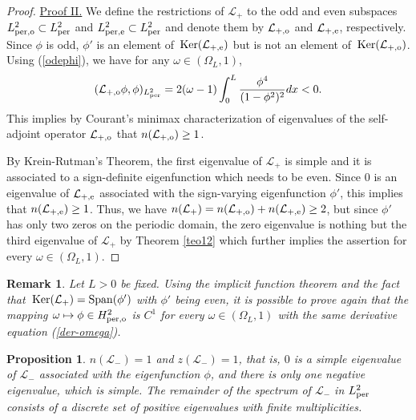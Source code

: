 \documentclass[12pt,reqno]{amsart}
\newcommand{\Ker}{{\rm \,Ker}}
\numberwithin{equation}{section}
\numberwithin{figure}{section}
\newtheorem{proposition}[theorem]{Proposition}
\newtheorem{remark}[theorem]{Remark}
\begin{document}
\begin{proof}
\underline{Proof II.} We define the restrictions of $\mathcal{L}_{+}$ to the odd and even subspaces $L_{\rm per,o}^2\subset L_{\rm per}^2$ and $L_{\rm per,e}^2\subset L_{\rm per}^2$ and denote them by  $\mathcal{L}_{+,\rm o}$ and $\mathcal{L}_{+,\rm e}$, respectively. Since $\phi$ is odd,  $\phi'$ is an element of $\Ker(\mathcal{L}_{+,\rm e})$ but is not an element of $\Ker(\mathcal{L}_{+,\rm o})$. Using (\ref{odephi}), we have for any $\omega \in (\Omega_L,1)$,
$$
		 	(\mathcal{L}_{+,\rm o}\phi,\phi)_{L_{\rm per}^2} = 2(\omega-1)\int_0^L\frac{\phi^4}{(1-\phi^2)^2}dx<0.
$$
This implies by Courant's minimax characterization of eigenvalues of the self-adjoint operator $\mathcal{L}_{+,\rm o}$ that $n(\mathcal{L}_{+,\rm o}) \geq 1$.

By  Krein-Rutman's Theorem, the first eigenvalue of $\mathcal{L}_{+}$ is simple and it is associated to a sign-definite eigenfunction which needs to be even.  Since $0$ is an eigenvalue of $\mathcal{L}_{+,\rm e}$ associated with the 
sign-varying eigenfunction $\phi'$, this implies that $n(\mathcal{L}_{+,\rm e}) \geq 1$. Thus, we have $n(\mathcal{L}_{+}) = n(\mathcal{L}_{+,\rm o}) + n(\mathcal{L}_{+,\rm e}) \geq 2$, but since $\phi'$ has only two zeros on the periodic domain, the zero eigenvalue is nothing but the third eigenvalue of $\mathcal{L}_+$ by Theorem \ref{teo12} which further implies the assertion for every $\omega \in (\Omega_L,1)$.
\end{proof}
		 
		 
		  \begin{remark}
		  	\label{smoothcurve2}
Let $L>0$ be fixed. Using the implicit function theorem and the fact that $\Ker(\mathcal{L}_+)={\rm Span}(\phi')$ with $\phi'$ being even, it is possible to prove again that the mapping $\omega \mapsto \phi \in H_{\rm per,o}^2$ is $C^1$ for every $\omega \in (\Omega_L,1)$ with the same derivative equation (\ref{der-omega}). 
		 \end{remark}
		 
\begin{proposition}
	\label{propL22} 
	$n(\mathcal{L}_-) = 1$ and $z(\mathcal{L}_-) = 1$, that is, 
	$0$ is a simple eigenvalue of $\mathcal{L}_{-}$ associated with the eigenfunction $\phi$, and there is only one negative eigenvalue, which is simple. The remainder of the spectrum of $\mathcal{L}_-$ in $L^2_{\rm per}$ consists of a discrete set of positive eigenvalues with finite multiplicities.
\end{proposition}
\end{document}
